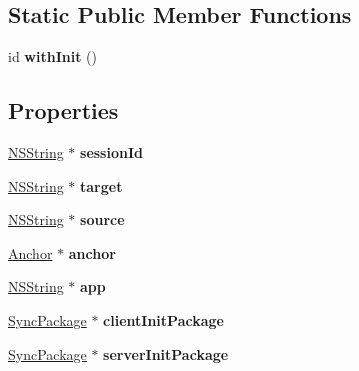 \subsection*{\-Static \-Public \-Member \-Functions}
\begin{DoxyCompactItemize}
\item 
\hypertarget{interface_session_a35fc96f2e86052070152638b1f4a1af1}{
id {\bfseries with\-Init} ()}
\label{interface_session_a35fc96f2e86052070152638b1f4a1af1}

\end{DoxyCompactItemize}
\subsection*{\-Properties}
\begin{DoxyCompactItemize}
\item 
\hypertarget{interface_session_a6d5756ab4187b004fdf35fec171d9cd6}{
\hyperlink{class_n_s_string}{\-N\-S\-String} $\ast$ {\bfseries session\-Id}}
\label{interface_session_a6d5756ab4187b004fdf35fec171d9cd6}

\item 
\hypertarget{interface_session_ac083c319c715c0109b43548677889524}{
\hyperlink{class_n_s_string}{\-N\-S\-String} $\ast$ {\bfseries target}}
\label{interface_session_ac083c319c715c0109b43548677889524}

\item 
\hypertarget{interface_session_aa5b52d84401afe540434bd1b284919dc}{
\hyperlink{class_n_s_string}{\-N\-S\-String} $\ast$ {\bfseries source}}
\label{interface_session_aa5b52d84401afe540434bd1b284919dc}

\item 
\hypertarget{interface_session_aa00ac4bd991eccfa1e7326deaeb7986b}{
\hyperlink{interface_anchor}{\-Anchor} $\ast$ {\bfseries anchor}}
\label{interface_session_aa00ac4bd991eccfa1e7326deaeb7986b}

\item 
\hypertarget{interface_session_ac5daf9d3a0d566f529feeacf34783d56}{
\hyperlink{class_n_s_string}{\-N\-S\-String} $\ast$ {\bfseries app}}
\label{interface_session_ac5daf9d3a0d566f529feeacf34783d56}

\item 
\hypertarget{interface_session_a2e518aa45a8fa466ab2ec6ec85f3bb3c}{
\hyperlink{interface_sync_package}{\-Sync\-Package} $\ast$ {\bfseries client\-Init\-Package}}
\label{interface_session_a2e518aa45a8fa466ab2ec6ec85f3bb3c}

\item 
\hypertarget{interface_session_a2bdb51676f7a0c30a1387410ec359d08}{
\hyperlink{interface_sync_package}{\-Sync\-Package} $\ast$ {\bfseries server\-Init\-Package}}
\label{interface_session_a2bdb51676f7a0c30a1387410ec359d08}


\end{DoxyCompactItemize}
